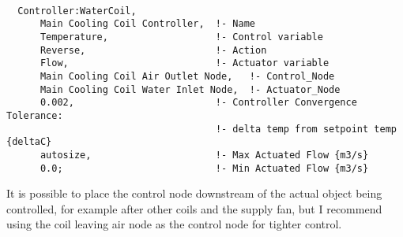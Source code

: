 \begin{lstlisting}

  Controller:WaterCoil,
      Main Cooling Coil Controller,  !- Name
      Temperature,                   !- Control variable
      Reverse,                       !- Action
      Flow,                          !- Actuator variable
      Main Cooling Coil Air Outlet Node,   !- Control_Node
      Main Cooling Coil Water Inlet Node,  !- Actuator_Node
      0.002,                         !- Controller Convergence Tolerance:
                                     !- delta temp from setpoint temp {deltaC}
      autosize,                      !- Max Actuated Flow {m3/s}
      0.0;                           !- Min Actuated Flow {m3/s}
\end{lstlisting}

It is possible to place the control node downstream of the actual object being controlled, for example after other coils and the supply fan, but I recommend using the coil leaving air node as the control node for tighter control.
